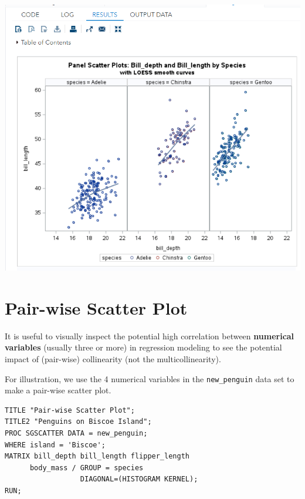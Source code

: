 \documentclass[
]{book}
\begin{document}
\begin{center}\includegraphics[width=1\linewidth]{img06/w06-panelScatterWithLoess} \end{center}

\hypertarget{pair-wise-scatter-plot}{%
\section{Pair-wise Scatter Plot}\label{pair-wise-scatter-plot}}

It is useful to visually inspect the potential high correlation between \textbf{numerical variables} (usually three or more) in regression modeling to see the potential impact of (pair-wise) collinearity (not the multicollinearity).

For illustration, we use the 4 numerical variables in the \texttt{new\_penguin} data set to make a pair-wise scatter plot.

\begin{verbatim}
TITLE "Pair-wise Scatter Plot";
TITLE2 "Penguins on Biscoe Island";
PROC SGSCATTER DATA = new_penguin;
WHERE island = 'Biscoe';
MATRIX bill_depth bill_length flipper_length 
      body_mass / GROUP = species 
                  DIAGONAL=(HISTOGRAM KERNEL);
RUN;
\end{verbatim}
\end{document}
